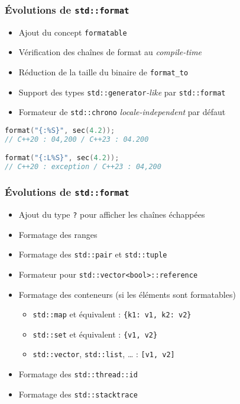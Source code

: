 \documentclass[C++.tex]{subfiles}
\begin{document}
\begin{frame}[fragile]
	\frametitle{Évolutions de \lstinline|std::format|}
	\begin{itemize}
		\item Ajout du concept \lstinline|formatable|
		\item Vérification des chaînes de format au \textit{compile-time}
		\item Réduction de la taille du binaire de \lstinline|format_to|
		\item Support des types \lstinline|std::generator|\textit{-like} par \lstinline|std::format|
		\item Formateur de \lstinline|std::chrono| \textit{locale-independent} par défaut

	\end{itemize}

	\begin{lstlisting}[language=C++]
format("{:%S}", sec(4.2));
// C++20 : 04,200 / C++23 : 04.200

format("{:L%S}", sec(4.2));
// C++20 : exception / C++23 : 04,200\end{lstlisting}
\end{frame}

\begin{frame}[fragile]
	\frametitle{Évolutions de \lstinline|std::format|}
	\begin{itemize}
		\item Ajout du type \lstinline|?| pour afficher les chaînes échappées
		\item Formatage des ranges
		\item Formatage des \lstinline|std::pair| et \lstinline|std::tuple|
		\item Formateur pour \lstinline|std::vector<bool>::reference|
		\item Formatage des conteneurs (si les éléments sont formatables)
		\begin{itemize}
			\item \lstinline|std::map| et équivalent : \lstinline|{k1: v1, k2: v2}|
			\item \lstinline|std::set| et équivalent : \lstinline|{v1, v2}|
			\item \lstinline|std::vector|, \lstinline|std::list|, \ldots{} : \lstinline|[v1, v2]|
		\end{itemize}
		\item Formatage des \lstinline|std::thread::id|
		\item Formatage des \lstinline|std::stacktrace|
	\end{itemize}
\end{frame}
\end{document}
